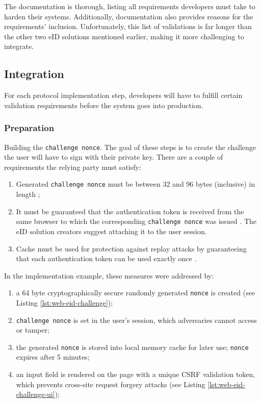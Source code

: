The documentation is thorough, listing all requirements developers must take to harden their systems. Additionally, documentation also provides reasons for the requirements' inclusion. Unfortunately, this list of validations is far longer than the other two eID solutions mentioned earlier, making it more challenging to integrate.

\subsection{Integration}

For each protocol implementation step, developers will have to fulfill certain validation requirements before the system goes into production.

\subsubsection{Preparation}

Building the \texttt{challenge nonce}. The goal of these steps is to create the challenge the user will have to sign with their private key. There are a couple of requirements the relying party must satisfy:
\begin{enumerate}
  \item Generated \texttt{challenge nonce} must be between 32 and 96 bytes (inclusive) in length \cite{ria-webeid-source-web-eid-app-authenticate};
  \item It must be guaranteed that the authentication token is received from the same browser to which the corresponding \texttt{challenge nonce} was issued \cite{ria-webeid-source-web-eid-authtoken-validation-java-readme}. The eID solution creators suggest attaching it to the user session.
  \item Cache must be used for protection against replay attacks by guaranteeing that each authentication token can be used exactly once \cite{ria-webeid-source-web-eid-authtoken-validation-java-readme}.
\end{enumerate}

In the implementation example, these measures were addressed by:
\begin{enumerate}
  \item a 64 byte cryptographically secure randomly generated \texttt{nonce} is created (see Listing \ref{lst:web-eid-challenge});
  \item \texttt{challenge nonce} is set in the user's session, which adversaries cannot access or tamper;
  \item the generated \texttt{nonce} is stored into local memory cache for later use; \texttt{nonce} expires after 5 minutes;
  \item an input field is rendered on the page with a unique CSRF validation token, which prevents cross-site request forgery attacks (see Listing \ref{lst:web-eid-challenge-ui});
\end{enumerate}

